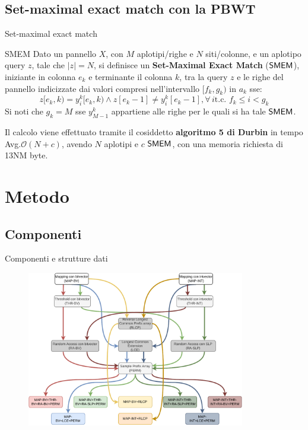 \documentclass{beamer}
\def\SMEM{\mbox{\rm {\sf SMEM}}}
\begin{document}
\subsection{Set-maximal exact match con la PBWT}
\begin{frame}{Set-maximal exact match}
  \begin{block}{SMEM}
    Dato un pannello $X$, con $M$ aplotipi/righe e $N$ siti/colonne, e un
    aplotipo 
    query $z$, tale che $|z|=N$, si definisce un \textbf{Set-Maximal Exact
      Match}  
      ($\SMEM$), iniziante in colonna $e_k$ e terminante il colonna
    $k$, tra 
    la query $z$ e le righe del pannello indicizzate dai valori compresi
    nell'intervallo $[f_k,g_k)$ in $a_k$ sse:
    \[z[e_k,k)=y_i^k[e_k,k)\land z[e_k-1]\neq y_i^k[e_k-1], \forall\, i\mbox{
        t.c. }f_k\leq i < g_k\]
    Si noti che $g_k=M$ sse $y_{M-1}^k$ appartiene alle righe per le quali si ha
    tale $\SMEM$.
  \end{block}
  \begin{block}{}
    Il calcolo viene effettuato tramite il cosiddetto \textbf{algoritmo 5 di
      Durbin}\cite{pbwt} in tempo Avg.$\mathcal{O}(N+c)$\cite{dpbwt}, avendo $N$
    aplotipi e 
    $c$ $\SMEM$, con una memoria richiesta di 13NM byte.
  \end{block}
\end{frame}
\section{Metodo}
\subsection{Componenti}
\begin{frame}{Componenti e strutture dati}
  \begin{block}{}
    \begin{figure}[H]
      \centering
      \includegraphics[width=0.85\textwidth]{img/ds.pdf}
    \end{figure}
  \end{block}
\end{frame}
\end{document}
